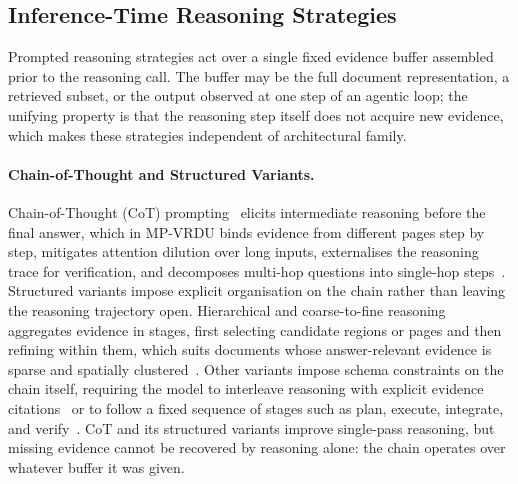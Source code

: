 \documentclass[11pt]{article}
\begin{document}
\subsection{Inference-Time Reasoning Strategies} 
\label{sec:tf-reasoning} Prompted reasoning strategies act over a single fixed evidence buffer assembled prior to the reasoning call. The buffer may be the full document representation, a retrieved subset, or the output observed at one step of an agentic loop; the unifying property is that the reasoning step itself does not acquire new evidence, which makes these strategies independent of architectural family.

\paragraph{Chain-of-Thought and Structured Variants.} Chain-of-Thought (CoT) prompting~\cite{wei2022chainofthought} elicits intermediate reasoning before the final answer, which in MP-VRDU binds evidence from different pages step by step, mitigates attention dilution over long inputs, externalises the reasoning trace for verification, and decomposes multi-hop questions into single-hop steps~\cite{jia2024leopard,xiong2026docr1}. Structured variants impose explicit organisation on the chain rather than leaving the reasoning trajectory open. Hierarchical and coarse-to-fine reasoning aggregates evidence in stages, first selecting candidate regions or pages and then refining within them, which suits documents whose answer-relevant evidence is sparse and spatially clustered~\cite{gong2025mhierrag,zhang2024cream}. Other variants impose schema constraints on the chain itself, requiring the model to interleave reasoning with explicit evidence citations~\cite{xiong2026docr1} or to follow a fixed sequence of stages such as plan, execute, integrate, and verify~\cite{guo2026endtoend}. CoT and its structured variants improve single-pass reasoning, but missing evidence cannot be recovered by reasoning alone: the chain operates over whatever buffer it was given.
\end{document}
